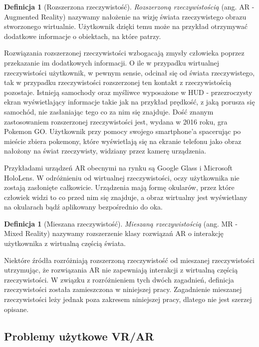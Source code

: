 \documentclass[a4paper,11pt,twoside]{report}
\theoremstyle{definition}
\newtheorem{definition}[theorem]{Definicja}
\begin{document}
\begin{definition}[Rozszerzona rzeczywistość]
\textit{Rozszerzoną rzeczywistością} (ang. AR - Augmented Reality) nazywamy nałożenie na wizję świata rzeczywistego obrazu stworzonego wirtualnie. Użytkownik dzięki temu może na przykład otrzymywać dodatkowe informacje o obiektach, na które patrzy.
\end{definition}

Rozwiązania rozszerzonej rzeczywistości wzbogacają zmysły człowieka poprzez przekazanie im dodatkowych informacji. O ile w przypadku wirtualnej rzeczywistości użytkownik, w pewnym sensie, odcinał się od świata rzeczywistego, tak w przypadku rzeczywistości rozszerzonej ten kontakt z rzeczywistością pozostaje. Istnieją samochody oraz myśliwce wyposażone w HUD - przezroczysty ekran wyświetlający informacje takie jak na przykład prędkość, z jaką porusza się samochód, nie zasłaniając tego co za nim się znajduje. Dość znanym zastosowaniem rozszerzonej rzeczywistości jest, wydana w 2016 roku, gra Pokemon GO. Użytkownik przy pomocy swojego smartphone'a spacerując po mieście zbiera pokemony, które wyświetlają się na ekranie telefonu jako obraz nałożony na  świat rzeczywisty, widziany przez kamerę urządzenia.

Przykładami urządzeń AR obecnymi na rynku są Google Glass i Microsoft HoloLens. W odróżnieniu od wirtualnej rzeczywistości, oczy użytkownika nie zostają zasłonięte całkowicie. Urządzenia mają formę okularów, przez które człowiek widzi to co przed nim się znajduje, a obraz wirtualny jest wyświetlany na okularach bądź aplikowany bezpośrednio do oka.

\begin{definition}[Mieszana rzeczywistość]
\textit{Mieszaną rzeczywistością} (ang. MR - Mixed Reality) nazywamy rozszerzenie klasy rozwiązań AR o interakcję użytkownika z wirtualną częścią świata.
\end{definition}

Niektóre źródła rozróżniają rozszerzoną rzeczywistość od mieszanej rzeczywistości utrzymując, że rozwiązania AR nie zapewniają interakcji z wirtualną częścią rzeczywistości. W związku z rozróżnieniem tych dwóch zagadnień, definicja rzeczywistości została zamieszczona w niniejszej pracy. Zagadnienie mieszanej rzeczywistości leży jednak poza zakresem niniejszej pracy, dlatego nie jest szerzej opisane. 

\subsection{Problemy użytkowe VR/AR }
\end{document}
